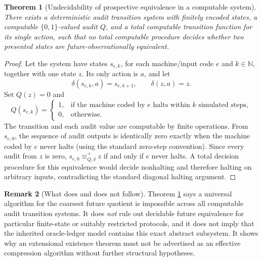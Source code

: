 \documentclass[11pt,letterpaper]{article}
\newtheorem{theorem}{Theorem}[section]
\theoremstyle{definition}
\newtheorem{remark}[theorem]{Remark}
\newcommand{\N}{\mathbb N}
\begin{document}
\begin{theorem}[Undecidability of prospective equivalence in a computable system]\label{thm:undec}
There exists a deterministic audit transition system with finitely encoded states, a computable $\{0,1\}$-valued audit $Q$, and a total computable transition function for its single action, such that no total computable procedure decides whether two presented states are future-observationally equivalent.
\end{theorem}
\begin{proof}
Let the system have states $s_{e,k}$, for each machine/input code $e$ and $k\in\N$, together with one state $z$. Its only action is $a$, and let
\[
\delta(s_{e,k},a)=s_{e,k+1},\qquad \delta(z,a)=z.
\]
Set $Q(z)=0$ and
\[
Q(s_{e,k})=\begin{cases}
1,&\text{if the machine coded by $e$ halts within $k$ simulated steps},\\
0,&\text{otherwise.}
\end{cases}
\]
The transition and each audit value are computable by finite operations. From $s_{e,0}$, the sequence of audit outputs is identically zero exactly when the machine coded by $e$ never halts (using the standard zero-step convention). Since every audit from $z$ is zero, $s_{e,0}\equiv_{Q,\delta}^{+}z$ if and only if $e$ never halts. A total decision procedure for this equivalence would decide nonhalting and therefore halting on arbitrary inputs, contradicting the standard diagonal halting argument.
\end{proof}

\begin{remark}[What does and does not follow]
Theorem \ref{thm:undec} says a universal algorithm for the coarsest future quotient is impossible across all computable audit transition systems. It does \emph{not} rule out decidable future equivalence for particular finite-state or suitably restricted protocols, and it does not imply that the inherited oracle-ledger model contains this exact abstract subsystem. It shows why an extensional existence theorem must not be advertised as an effective compression algorithm without further structural hypotheses.
\end{remark}
\end{document}
